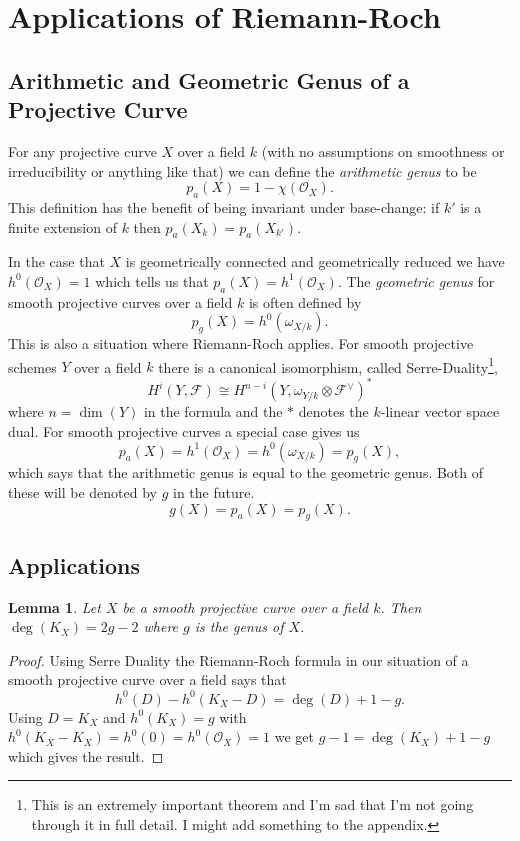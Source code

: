 \documentclass[12pt]{article}
\numberwithin{equation}{section}
\newtheorem{lemma}[theorem]{Lemma}
\theoremstyle{definition}
\theoremstyle{remark}
\newcommand{\Ocal}{\mathcal{O}}
\newcommand{\Fcal}{\mathcal{F}}
\begin{document}
\section{Applications of Riemann-Roch}


\subsection{Arithmetic and Geometric Genus of a Projective Curve}
For any projective curve $X$ over a field $k$ (with no assumptions on smoothness or irreducibility or anything like that) we can define the \emph{arithmetic genus} to be 
 $$p_a(X) = 1-\chi(\Ocal_X).$$
This definition has the benefit of being invariant under base-change: if $k'$ is a finite extension of $k$ then $p_a(X_k) = p_a(X_{k'})$.

In the case that $X$ is geometrically connected and geometrically reduced we have $h^0(\Ocal_X) = 1$ which tells us that $p_a(X) = h^1(\Ocal_X)$. 
The \emph{geometric genus} for smooth projective curves over a field $k$ is often defined by 
 $$p_g(X) = h^0(\omega_{X/k}).$$
This is also a situation where Riemann-Roch applies. 
For smooth projective schemes $Y$ over a field $k$ there is a canonical isomorphism, called Serre-Duality\footnote{This is an extremely important theorem and I'm sad that I'm not going through it in full detail. I might add something to the appendix.}, 
 $$ H^i(Y,\Fcal) \cong H^{n-i}(Y,\omega_{Y/k}\otimes \Fcal^{\vee})^* $$
where $n=\dim(Y)$ in the formula and the $*$ denotes the $k$-linear vector space dual. 
For smooth projective curves a special case gives us
 $$ p_a(X) = h^1(\Ocal_X) = h^0(\omega_{X/k}) = p_g(X), $$
which says that the arithmetic genus is equal to the geometric genus.
Both of these will be denoted by $g$ in the future.  
$$ g(X) = p_a(X) = p_g(X).$$

\subsection{Applications}

\begin{lemma}
	Let $X$ be a smooth projective curve over a field $k$. 
	Then $\deg(K_X) = 2g-2$ where $g$ is the genus of $X$. 
\end{lemma}
\begin{proof}
	Using Serre Duality the Riemann-Roch formula in our situation of a smooth projective curve over a field says that 
	 $$ h^0(D) - h^0(K_X-D) = \deg(D) + 1-g. $$
	Using $D = K_X$ and $h^0(K_X)=g$ with $h^0(K_X-K_X) = h^0(0) = h^0(\Ocal_X)=1$ we get 
	$g - 1 = \deg(K_X) + 1-g$ which gives the result.
\end{proof}
\end{document}

